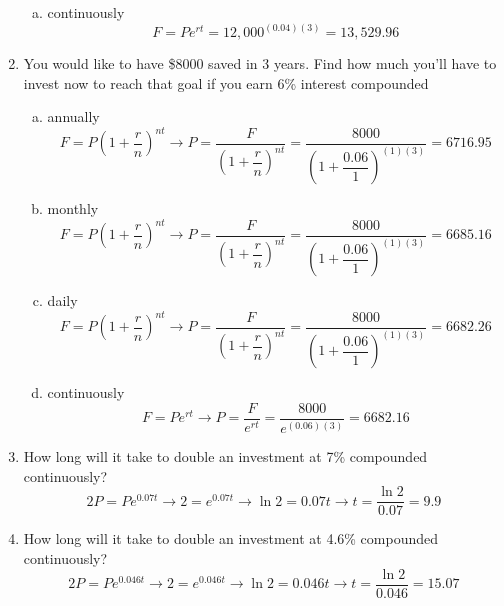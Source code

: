 \begin{enumerate}
\begin{enumerate}[(a)]
\item continuously 
\[F = Pe^{rt} = 12,000^{(0.04)(3)} = 13,529.96\]
\end{enumerate}

\item You would like to have \$8000 saved in 3 years.  Find how much you'll have to invest now to reach that goal if you earn 6\% interest compounded
\begin{enumerate}[(a)]
\item annually 
\[F = P\left(1 + \dfrac{r}{n}\right)^{nt} \longrightarrow P = \dfrac{F}{\left(1 + \dfrac{r}{n}\right)^{nt}} = \dfrac{8000}{\left(1 + \dfrac{0.06}{1}\right)^{(1)(3)}} = 6716.95\]

\item monthly 
\[F = P\left(1 + \dfrac{r}{n}\right)^{nt} \longrightarrow P = \dfrac{F}{\left(1 + \dfrac{r}{n}\right)^{nt}} = \dfrac{8000}{\left(1 + \dfrac{0.06}{1}\right)^{(1)(3)}} = 6685.16\]

\item daily 
\[F = P\left(1 + \dfrac{r}{n}\right)^{nt} \longrightarrow P = \dfrac{F}{\left(1 + \dfrac{r}{n}\right)^{nt}} = \dfrac{8000}{\left(1 + \dfrac{0.06}{1}\right)^{(1)(3)}} = 6682.26\]

\item continuously 
\[F = Pe^{rt} \longrightarrow P = \dfrac{F}{e^{rt}} = \dfrac{8000}{e^{(0.06)(3)}} = 6682.16\]
\end{enumerate}

\item How long will it take to double an investment at 7\% compounded continuously? 
\[2P = Pe^{0.07t} \longrightarrow 2 = e^{0.07t} \longrightarrow \ln 2 = 0.07t \longrightarrow t = \dfrac{\ln 2}{0.07} = 9.9\]

\item How long will it take to double an investment at 4.6\% compounded continuously? 
\[2P = Pe^{0.046t} \longrightarrow 2 = e^{0.046t} \longrightarrow \ln 2 = 0.046t \longrightarrow t = \dfrac{\ln 2}{0.046} = 15.07\]
\end{enumerate}
